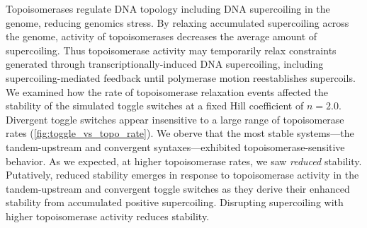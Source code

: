 \documentclass[11pt]{article}
\begin{document}
Topoisomerases regulate DNA topology including DNA supercoiling in the genome, reducing genomics stress. %
By relaxing accumulated supercoiling across the genome, activity of topoisomerases decreases the average amount of supercoiling. Thus topoisomerase activity may temporarily relax constraints generated through transcriptionally-induced DNA supercoiling, including supercoiling-mediated feedback until polymerase motion reestablishes supercoils.
We examined how the rate of topoisomerase relaxation events affected the stability of the simulated toggle switches at a fixed Hill coefficient of \(n = 2.0\). Divergent toggle switches appear insensitive to a large range of topoisomerase rates (\cref{fig:toggle_vs_topo_rate}). We oberve that the most stable systems---the tandem-upstream and convergent syntaxes---exhibited topoisomerase-sensitive behavior. As we expected, at higher topoisomerase rates, we saw \emph{reduced} stability. Putatively, reduced stability emerges in response to topoisomerase activity in the tandem-upstream and convergent toggle switches as they derive their enhanced stability from accumulated positive supercoiling. Disrupting supercoiling with higher topoisomerase activity reduces stability.
\end{document}
